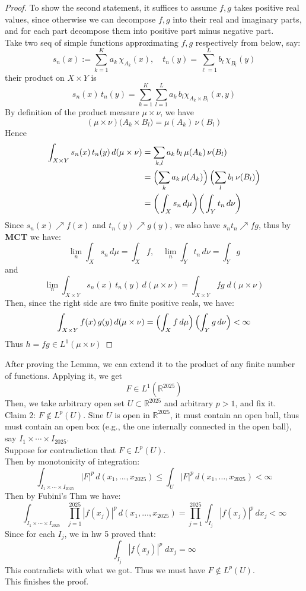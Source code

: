 \documentclass[lang=cn,11pt]{elegantbook}
\begin{document}
\begin{solution}
\begin{proof}
To show the second statement, it suffices to assume $f,g$ takes positive real values, since otherwise we can decompose $f,g$ into their real and imaginary parts, and for each part decompose them into positive part minus negative part.\\
Take two seq of simple functions approximating $f,g$ respectively from below, say: \[
   s_n(x)  := 
   \sum_{k=1}^K a_k\,\chi_{A_k}(x),  
   \quad
   t_n(y)  =
   \sum_{\ell=1}^L b_l \,\chi_{B_l}(y)
\]
their product on \(X\times Y\) is \[
   s_n(x)\,t_n(y)  = 
   \sum_{k=1}^K\sum_{l=1}^L 
       a_k\,b_l \chi_{A_k\times B_l}(x,y)
\]
By definition of the product measure \(\mu\times\nu\), we have
\[
   (\mu\times\nu)\bigl(A_k\times B_l\bigr) = 
   \mu(A_k)\,\nu(B_l)
\]
Hence \begin{align*}
     \int_{X\times Y} s_n(x)\,t_n(y)\,d(\mu\times\nu) &= 
   \sum_{k,l} a_k\,b_l\,\mu(A_k)\,\nu(B_l) \\ &= 
   \Bigl(\sum_{k} a_k\,\mu(A_k)\Bigr)\,\Bigl(\sum_{l} b_l\,\nu(B_l)\Bigr) \\
   &= \bigg( \int_X s_n\,d\mu \bigg)
 \bigg(  \int_Y t_n\,d\nu\bigg)
\end{align*}
Since \(s_n(x)\nearrow f(x)\) and \(t_n(y)\nearrow g(y)\), we also have $s_n t_n \nearrow fg$, thus by \textbf{MCT} we have: \[
\lim_n  \int_X s_n\,d\mu  = \int_X f,\quad \lim_n  \int_Y t_n\,d\nu  = \int_Y g
\] and \[
\lim_n \int_{X\times Y} s_n(x)\,t_n(y)\,d(\mu\times\nu)  =  \int_{X\times Y}   fg \; d(\mu\times \nu)
\]
Then, since the right side are two finite positive reals, we have: \[
   \int_{X\times Y} f(x)\,g(y)\,d(\mu\times\nu) =
   \Bigl(\int_X f\,d\mu\Bigr)\,   \Bigl(\int_Y g\,d\nu\Bigr) < \infty
\]
Thus $h = fg \in L^1(\mu \times \nu)$
\end{proof}
After proving the Lemma, we can extend it to the product of any finite number of functions. Applying it, we get \[
F \in L^1(\mathbb{R}^{2025})
\]
Then, we take arbitrary open set $U \subset \mathbb{R}^{2025}$ and arbitrary $p>1$, and fix it.\\
Claim 2: $F \not \in L^p (U)$.
Sine $U$ is open in $\mathbb{R}^{2025}$, it must contain an open ball, thus must contain an open box (e.g., the one internally connected in the open ball), say $I_1 \times \cdots \times I_{2025}$.\\
Suppose for contradiction that $F \in L^p (U)$.\\
Then by monotonicity of integration: \[
  \int_{I_1\times\cdots\times I_{2025}} |F|^p \,d(x_1,\ldots,x_{2025}) \leq \int_U |F|^p \,d(x_1,\ldots,x_{2025})  < \infty
\]
Then by Fubini's Thm we have:
\[
     \int_{I_1\times\cdots\times I_{2025}}
       \prod_{j=1}^{2025} |f(x_j)|^p
     \,d(x_1,\ldots,x_{2025}) = \prod_{j=1}^{2025}
     \int_{I_j} |f(x_j)|^p \,dx_j < \infty
   \]
Since for each $I_j$, we in hw 5 proved that: \[
\int_{I_j} |f(x_j)|^p\; dx_j=\infty 
\]
This contradicts with what we got. Thus we must have $F \not \in L^p (U)$.\\
This finishes the proof.
\end{solution}
\end{document}
